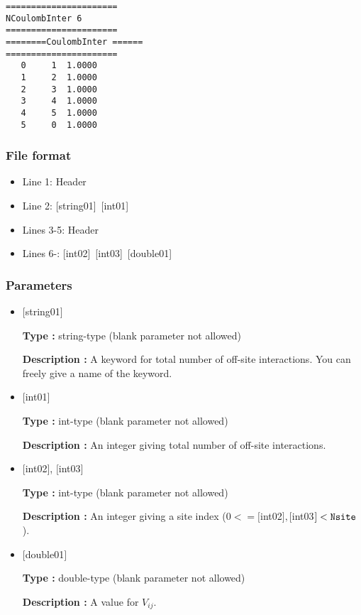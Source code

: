\begin{minipage}{12.5cm}
\begin{screen}
\begin{verbatim}
====================== 
NCoulombInter 6  
====================== 
========CoulombInter ====== 
====================== 
   0     1  1.0000
   1     2  1.0000
   2     3  1.0000
   3     4  1.0000
   4     5  1.0000
   5     0  1.0000
\end{verbatim}
\end{screen}
\end{minipage}

\subsubsection{File format}
 \begin{itemize}
   \item  Line 1:  Header
   \item  Line 2:   [string01]~[int01]
   \item  Lines 3-5:  Header
   \item  Lines 6-: 
   [int02]~[int03]~[double01] 
  \end{itemize}
\subsubsection{Parameters}
 \begin{itemize}

   \item  $[$string01$]$
   
    {\bf Type :} string-type (blank parameter not allowed)

   {\bf Description :} A keyword for total number of off-site interactions. You can freely give a name of the keyword.

   \item  $[$int01$]$
   
    {\bf Type :} int-type (blank parameter not allowed)

   {\bf Description :}  An integer giving total number of off-site interactions.

  \item  $[$int02$]$, $[$int03$]$
  
 {\bf Type :} int-type (blank parameter not allowed)

{\bf Description :} An integer giving a site index ($0<= [$int02$], [$int03$]<\verb|Nsite|$).
 
 \item  $[$double01$]$
   
   {\bf Type :} double-type (blank parameter not allowed)

  {\bf Description :}  A value for $V_{ij}$.
  
\end{itemize}


